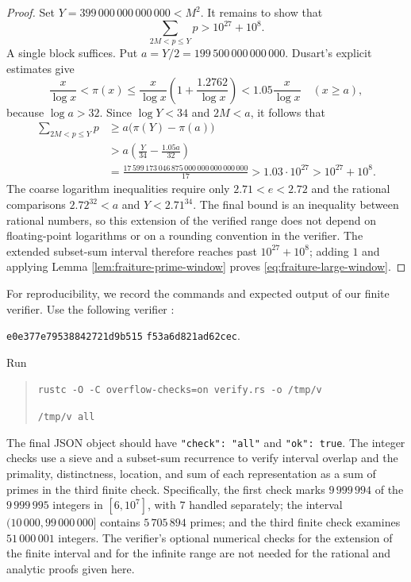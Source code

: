 \documentclass[11pt,letterpaper,reqno]{amsart}
\numberwithin{equation}{section}
\theoremstyle{remark}
\renewcommand{\leq}{\leqslant}
\renewcommand{\geq}{\geqslant}
\begin{document}
\begin{proof}
Set $Y=399\,000\,000\,000\,000<M^2$. It remains to show that
\[
 \sum_{2M<p\leq Y}p>10^{27}+10^8.
\]
A single block suffices. Put $a=Y/2=199\,500\,000\,000\,000$.
Dusart's explicit estimates \cite[Theorem~6.9]{Dusart2010} give
\[
 \frac{x}{\log x}<\pi(x)
 \leq\frac{x}{\log x}\left(1+\frac{1.2762}{\log x}\right)
 <1.05\frac{x}{\log x}
 \quad(x\geq a),
\]
because $\log a>32$. Since $\log Y<34$ and $2M<a$, it follows that
\begin{align*}
 \sum_{2M<p\leq Y}p
 &\geq a\bigl(\pi(Y)-\pi(a)\bigr)\\
 &>a\left(\frac{Y}{34}-\frac{1.05a}{32}\right)\\
 &=\frac{17\,599\,173\,046\,875\,000\,000\,000\,000\,000}{17}
 >1.03\cdot10^{27}>10^{27}+10^8.
\end{align*}
The coarse logarithm inequalities require only
$2.71<e<2.72$ and the rational comparisons
$2.72^{32}<a$ and $Y<2.71^{34}$.
The final bound is an inequality between rational numbers, so this extension of the verified range
does not depend on floating-point logarithms or on a rounding convention
in the verifier.
The extended subset-sum interval therefore reaches past $10^{27}+10^8$;
adding $1$ and applying Lemma \ref{lem:fraiture-prime-window} proves
\eqref{eq:fraiture-large-window}.
\end{proof}

For reproducibility, we record the commands and expected output of our finite verifier.
Use the following verifier \cite{FraitureVerifier}:
\par\noindent
\texttt{e0e377e79538842721d9b515}%
\allowbreak\texttt{f53a6d821ad62cec}.
\par\noindent
Run
\begin{quote}
\texttt{rustc -O -C overflow-checks=on verify.rs -o /tmp/v}\par
\texttt{/tmp/v all}
\end{quote}
The final JSON object should have \texttt{"check": "all"} and
\texttt{"ok": true}. The integer checks use a sieve and a subset-sum recurrence to verify
interval overlap and the primality, distinctness, location, and sum of
each representation as a sum of primes in the third finite check. Specifically, the first
check marks $9\,999\,994$ of the $9\,999\,995$ integers in
$[6,10^7]$, with $7$ handled separately; the interval $(10\,000,99\,000\,000]$ contains
$5\,705\,894$ primes; and the third finite check examines
$51\,000\,001$ integers. The verifier's optional numerical checks for
the extension of the finite interval and for the infinite range are not
needed for the rational and analytic proofs given here.
\end{document}
